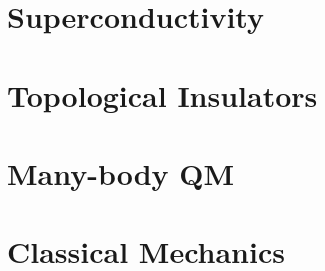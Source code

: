 \documentclass[mathserif]{beamer}
\begin{document}
	\color{white}
	
	
	
	
	
	\section{Superconductivity}
	
	
	
	\section{Topological Insulators}
	
	
	
	\section{Many-body QM}
	
	
	\section{Classical Mechanics}
	
	
	
\end{document}
